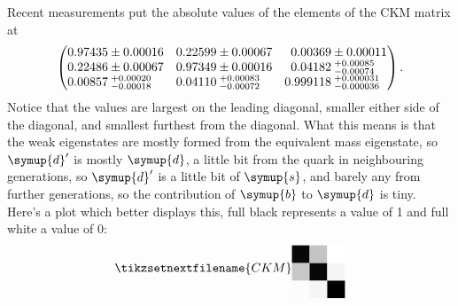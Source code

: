 \documentclass[fleqn]{NotesClass}
\newcommand{\Pparticle}[1]{\symup{#1}}
\newcommand{\Pd}{\ensuremath{\Pparticle{d}}}
\newcommand{\Ps}{\ensuremath{\Pparticle{s}}}
\newcommand{\Pb}{\ensuremath{\Pparticle{b}}}
\begin{document}
    Recent measurements put the absolute values of the elements of the CKM matrix at
    \begingroup
    \def\arraystretch{1.4}
    \begin{equation}
        \left(
        \begin{array}{@{}r@{}lr@{}lr@{}l@{}}
            0.97435 & {} \pm 0.00016 & 0.22599 & {} \pm 0.00067 & 0.00369 & {} \pm 0.00011\\
            0.22486 & {} \pm 0.00067 & 0.97349 & {} \pm 0.00016 & 0.04182 & {} \mathbin{\substack{+0.00085\\ -0.00074}} {}\\
            0.00857 & {} \mathbin{\substack{+0.00020\\ -0.00018}} {} & 0.04110 & {} \mathbin{\substack{+0.00083\\ -0.00072}} {} &  0.999118 & {}  \mathbin{\substack{+ 0.000031\\ - 0.000036}} {}
        \end{array}
        \right)
        .
    \end{equation}
    \endgroup
    Notice that the values are largest on the leading diagonal, smaller either side of the diagonal, and smallest furthest from the diagonal.
    What this means is that the weak eigenstates are mostly formed from the equivalent mass eigenstate, so \(\Pd'\) is mostly \(\Pd\), a little bit from the quark in neighbouring generations, so \(\Pd'\) is a little bit of \(\Ps\), and barely any from further generations, so the contribution of \(\Pb\) to \(\Pd\) is tiny.
    Here's a plot which better displays this, full black represents a value of 1 and full white a value of 0:
    \begin{equation}
        \tikzsetnextfilename{CKM}
        \begin{tikzpicture}[baseline=(current bounding box)]
            \fill[black!1!white] (0, 0) rectangle (0.5, 0.5);
            \fill[black!4!white] (0.5, 0) rectangle (1, 0.5);
            \fill[black!100!white] (1, 0) rectangle (1.5, 0.5);
            \fill[black!22!white] (0, 0.5) rectangle (0.5, 1);
            \fill[black!97!white] (0.5, 0.5) rectangle (1, 1);
            \fill[black!4!white] (1, 0.5) rectangle (1.5, 1);
            \fill[black!97!white] (0, 1) rectangle (0.5, 1.5);
            \fill[black!23!white] (0.5, 1) rectangle (1, 1.5);
            \fill[black!0!white] (1, 1) rectangle (1.5, 1.5);
        \end{tikzpicture}
    \end{equation}
    
\end{document}
